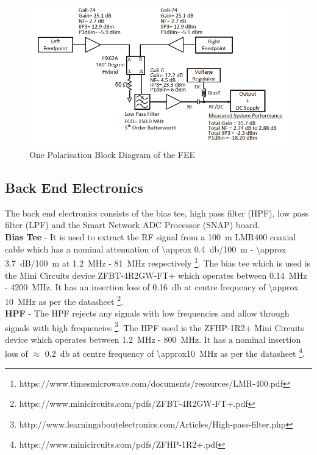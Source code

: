 \documentclass{ws-jai}
\begin{document}
\begin{figure}[h]
	\begin{center}
		\includegraphics[width=0.7\linewidth]{Figures/Balun_Block.png}
		\caption{One Polarisation Block Diagram of the FEE \cite{2012PASP..124.1090H}}
		\label{Fig:Balun Schematic}
	\end{center}
\end{figure}

\subsection{Back End Electronics}	
The back end electronics consists of the bias tee, high pass filter (HPF), low pass filter (LPF) and the Smart Network ADC Processor (SNAP) board. \\

\textbf{Bias Tee} - It is used to extract the RF signal from a \SI{100}{\metre} LMR400 coaxial cable which has a nominal attenuation of \SI{\approx 0.4}{\decibel/\SI{100}{m}} - \SI{\approx 3.7}{dB/\SI{100}{\metre}} at \SI{1.2}{MHz} - \SI{81}{MHz} respectively \footnote{https://www.timesmicrowave.com/documents/resources/LMR-400.pdf}. The bias tee which is used is the Mini Circuits device ZFBT-4R2GW-FT+ which operates between \SI{0.14}{MHz} - \SI{4200}{MHz}. It has an insertion loss of \SI{0.16}{\decibel} at centre frequency of  \SI{\approx 10}{MHz} as per the datasheet \footnote{https://www.minicircuits.com/pdfs/ZFBT-4R2GW-FT+.pdf}.\\

\textbf{HPF} - The HPF rejects any signals with low frequencies and allow through signals with high frequencies \footnote{http://www.learningaboutelectronics.com/Articles/High-pass-filter.php}. The HPF used is the ZFHP-1R2+ Mini Circuits device which operates between  \SI{1.2}{MHz} - \SI{800}{MHz}. It has a nominal insertion loss of $\approx$ \SI{0.2}{\decibel} at centre frequency of  \SI{\approx10}{MHz} as per the datasheet \footnote{https://www.minicircuits.com/pdfs/ZFHP-1R2+.pdf}.\\
\end{document}
